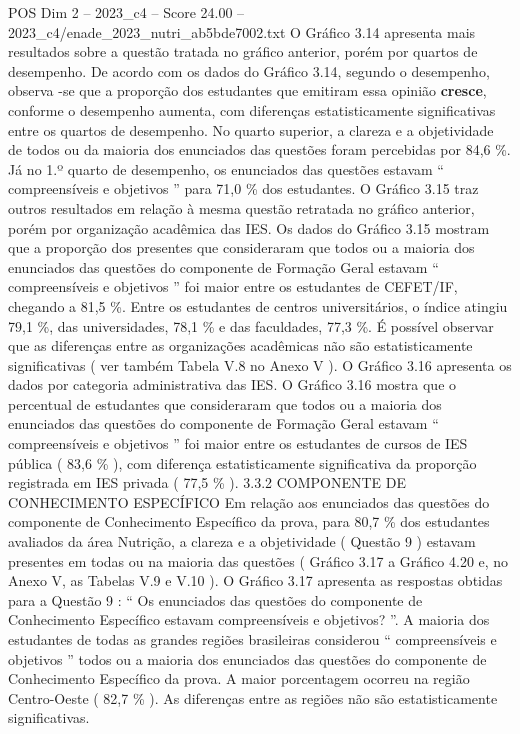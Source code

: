 \begin{textsample}{POS Dim 2 – 2023\_c4 – Score 24.00 – 2023\_c4/enade\_2023\_nutri\_ab5bde7002.txt}
O Gráfico 3.14 apresenta mais resultados sobre a questão tratada no gráfico anterior, porém por quartos de desempenho.
De acordo com os dados do Gráfico 3.14, segundo o desempenho, observa -se que a proporção dos estudantes que emitiram essa opinião \textbf{cresce}, conforme o desempenho aumenta, com diferenças estatisticamente significativas entre os quartos de desempenho.
No quarto superior, a clareza e a objetividade de todos ou da maioria dos enunciados das questões foram percebidas por 84,6 \%.
Já no 1.º quarto de desempenho, os enunciados das questões estavam “ compreensíveis e objetivos ” para 71,0 \% dos estudantes.
O Gráfico 3.15 traz outros resultados em relação à mesma questão retratada no gráfico anterior, porém por organização acadêmica das IES.
Os dados do Gráfico 3.15 mostram que a proporção dos presentes que consideraram que todos ou a maioria dos enunciados das questões do componente de Formação Geral estavam “ compreensíveis e objetivos ” foi maior entre os estudantes de CEFET/IF, chegando a 81,5 \%.
Entre os estudantes de centros universitários, o índice atingiu 79,1 \%, das universidades, 78,1 \% e das faculdades, 77,3 \%.
É possível observar que as diferenças entre as organizações acadêmicas não são estatisticamente significativas ( ver também Tabela V.8 no Anexo V ).
O Gráfico 3.16 apresenta os dados por categoria administrativa das IES.
O Gráfico 3.16 mostra que o percentual de estudantes que consideraram que todos ou a maioria dos enunciados das questões do componente de Formação Geral estavam “ compreensíveis e objetivos ” foi maior entre os estudantes de cursos de IES pública ( 83,6 \% ), com diferença estatisticamente significativa da proporção registrada em IES privada ( 77,5 \% ). 3.3.2 COMPONENTE DE CONHECIMENTO ESPECÍFICO Em relação aos enunciados das questões do componente de Conhecimento Específico da prova, para 80,7 \% dos estudantes avaliados da área Nutrição, a clareza e a objetividade ( Questão 9 ) estavam presentes em todas ou na maioria das questões ( Gráfico 3.17 a Gráfico 4.20 e, no Anexo V, as Tabelas V.9 e V.10 ).
O Gráfico 3.17 apresenta as respostas obtidas para a Questão 9 : “ Os enunciados das questões do componente de Conhecimento Específico estavam compreensíveis e objetivos? ”.
A maioria dos estudantes de todas as grandes regiões brasileiras considerou “ compreensíveis e objetivos ” todos ou a maioria dos enunciados das questões do componente de Conhecimento Específico da prova.
A maior porcentagem ocorreu na região Centro-Oeste ( 82,7 \% ).
As diferenças entre as regiões não são estatisticamente significativas.

\end{textsample}
